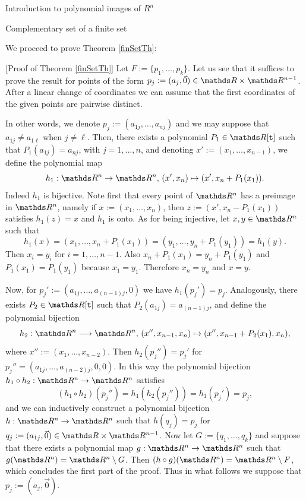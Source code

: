 \documentclass[11pt, a4paper, english, twoside, notitlepage, openright]{report}
\begin{document}
\begin{chapter}{Introduction to polynomial images of $R^n$}
\begin{section}{Complementary set of a finite set}
	
We proceed to prove Theorem \ref{finSetTh}:
	
\vspace{1mm}
	
[Proof of Theorem \ref{finSetTh}] Let $F:=\{p_1,\dots,p_k\}$. Let us see that it suffices to prove the result for points of the form $p_j:=(a_j,\vec{0})\in\R\times\R^{n-1}$. After a linear change of coordinates we can assume that the first coordinates of the given points are pairwise distinct. 

In other words, we denote $p_j:=(a_{1j},\dots,a_{nj})$ and we may suppose that $a_{1j}\neq a_{1\ell}$ when $j\neq\ell$. Then, there exists a polynomial $P_1\in\R[{\tt t}]$ such that $P_1(a_{1j})=a_{nj}$, with $j = 1,\dots, n$, and denoting $x':=(x_1,\dots,x_{n-1})$, we  define the polynomial map 
$$
h_1:\R^n\to\R^n,\, (x',x_n)\mapsto (x',x_n+P_1(x_1)).
$$
Indeed $h_1$ is bijective. Note first that every point of $\R^n$ has a preimage in $\R^n$, namely if $x:=(x_1, \dots,x_n)$, then $z:=(x',x_n-P_1(x_1))$ satisfies $h_1(z)=x$ and $h_1$ is onto. As for being injective, let $x,y\in\R^n$ such that 
$$
h_1(x)=(x_1,\dots,x_n+ P_1(x_1))=(y_1,\dots,y_n+ P_1(y_1))=h_1(y).
$$ 
Then $x_i=y_i$ for $i=1,\dots,n-1$. Also $x_n+P_1(x_1)=y_n+P_1(y_1)$ and $P_1(x_1)=P_1(y_1)$ because $x_1= y_1$. Therefore $x_n=y_n$ and $x=y$.
		
Now, for $p_j':=(a_{1j},\dots,a_{(n-1)j},0)$ we have $h_1(p_j')=p_j$. Analogously, there exists $P_2\in\R[{\tt t}]$ such that $P_2(a_{1j}) = a_{(n-1)j}$, and define the polynomial bijection
$$
h_2:\R^n\longrightarrow \R^n,\,(x'',x_{n-1},x_n)\mapsto (x'',x_{n-1}+P_2(x_1),x_n),
$$
where $x'':=(x_1,\dots,x_{n-2})$. Then $h_2(p_j'')=p_j'$ for $p_j''= (a_{1j},\dots,a_{(n-2)j},0,0)$. In this way the polynomial bijection $h_1\circ h_2:\R^n\to\R^n$ satisfies
$$
(h_1\circ h_2)(p_j'')=h_1(h_2(p_j''))=h_1(p_j')=p_j,
$$
and we can inductively construct a polynomial bijection $h:\R^n\rightarrow\R^n$ such that $h(q_j)=p_j$ for $q_j:=(a_{1j},\vec{0})\in\R\times\R^{n-1}$. Now let $G:=\{q_1,\dots,q_k\}$ and suppose that there exists a polynomial map $g:\R^n\rightarrow\R^n$ such that $g(\R^n)=\R^n\setminus G$. Then $(h\circ g)(\R^n) = \R^n \setminus F$, which concludes the first part of the proof. Thus in what follows we suppose that $p_j:=(a_j,\vec{0})$.
		

\end{section}
\end{chapter}
\end{document}
